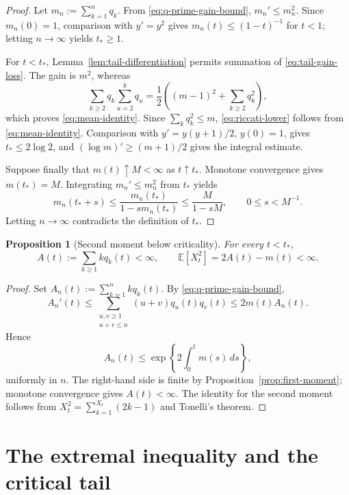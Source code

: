\documentclass[11pt,a4paper]{amsart}
\newtheorem{proposition}[theorem]{Proposition}
\theoremstyle{remark}
\begin{document}
\begin{proof}
Let \(m_n:=\sum_{k=1}^nq_k\). From
\eqref{eq:q-prime-gain-bound}, \(m_n'\leq m_n^2\). Since \(m_n(0)=1\),
comparison with \(y'=y^2\) gives \(m_n(t)\leq(1-t)^{-1}\) for \(t<1\);
letting \(n\to\infty\) yields \(t_*\geq1\).

For \(t<t_*\), Lemma~\ref{lem:tail-differentiation} permits summation of
\eqref{eq:tail-gain-loss}. The gain is \(m^2\), whereas
\[
        \sum_{k\geq2}q_k\sum_{u=2}^{k}q_u
        =
        \frac12\left((m-1)^2+\sum_{k\geq2}q_k^2\right),
\]
which proves \eqref{eq:mean-identity}. Since
\(\sum_kq_k^2\leq m\), \eqref{eq:riccati-lower} follows from \eqref{eq:mean-identity}. Comparison with
\(y'=y(y+1)/2\), \(y(0)=1\), gives \(t_*\leq2\log2\), and
\((\log m)'\geq(m+1)/2\) gives the integral estimate.

Suppose finally that \(m(t)\uparrow M<\infty\) as \(t\uparrow t_*\).
Monotone convergence gives \(m(t_*)=M\). Integrating
\(m_n'\leq m_n^2\) from \(t_*\) yields
\[
        m_n(t_*+s)
        \leq
        \frac{m_n(t_*)}{1-sm_n(t_*)}
        \leq
        \frac{M}{1-sM},
        \qquad 0\leq s<M^{-1}.
\]
Letting \(n\to\infty\) contradicts the definition of \(t_*\).
\end{proof}

\begin{proposition}[Second moment below criticality]
\label{prop:polynomial-moments}
For every \(t<t_*\),
\[
        A(t):=\sum_{k\geq1}kq_k(t)<\infty,
        \qquad
        \mathbb{E}[X_t^2]=2A(t)-m(t)<\infty.
\]
\end{proposition}

\begin{proof}
Set \(A_n(t):=\sum_{k=1}^n kq_k(t)\). By
\eqref{eq:q-prime-gain-bound},
\[
        A_n'(t)
        \leq
        \sum_{\substack{u,v\geq1\\u+v\leq n}}
        (u+v)q_u(t)q_v(t)
        \leq2m(t)A_n(t).
\]
Hence
\[
        A_n(t)
        \leq
        \exp\left\{2\int_0^tm(s)\,ds\right\},
\]
uniformly in \(n\). The right-hand side is finite by
Proposition~\ref{prop:first-moment}; monotone convergence gives
\(A(t)<\infty\). The identity for the second moment follows from
\(X_t^2=\sum_{k=1}^{X_t}(2k-1)\) and Tonelli's theorem.
\end{proof}

\section{The extremal inequality and the critical tail}
\label{sec:critical-tail}
\end{document}

